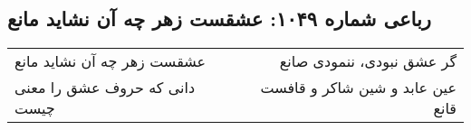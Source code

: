 \begin{center}
\section*{رباعی شماره ۱۰۴۹: عشقست زهر چه آن نشاید مانع}
\label{sec:1049}
\begin{longtable}{l p{0.5cm} r}
عشقست زهر چه آن نشاید مانع
&&
گر عشق نبودی، ننمودی صانع
\\
دانی که حروف عشق را معنی چیست
&&
عین عابد و شین شاکر و قافست قانع
\\
\end{longtable}
\end{center}
